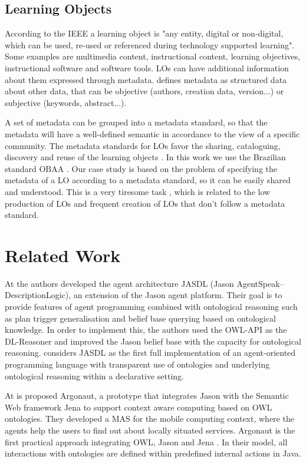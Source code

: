 \documentclass[a4paper,twoside]{article}
\begin{document}
\subsection{Learning Objects}

\noindent According to the IEEE \cite{ref40} a learning object is "any entity, digital or non-digital, which can be used, re-used or referenced during technology supported learning". Some examples are multimedia content, instructional content, learning objectives, instructional software and software tools. LOs can have additional information about them expressed through metadata.
\cite{ref42} defines metadata as structured data about other data, that can be objective (authors, creation data, version...) or subjective (keywords, abstract...). 

A set of metadata can be grouped into a metadata standard, so that the metadata will have a well-defined semantic in accordance to the view of a specific community. The metadata standards for LOs favor the sharing, cataloguing, discovery and reuse of the learning objects \cite{ref42}. In this work we use the Brazilian standard OBAA \cite{refOBAA}. Our case study is based on the problem of specifying the metadata of a LO according to a metadata standard, so it can be easily shared and understood. This is a very tiresome task \cite{ref38}, which is related to the low production of LOs and frequent creation of LOs that don't follow a metadata standard. 

\section{Related Work}
\label{sec:relatedwork}

\noindent At \cite{refB} the authors developed the agent architecture JASDL (Jason AgentSpeak–DescriptionLogic), an  extension of the Jason agent platform. Their goal is to provide features of agent programming combined with ontological reasoning such as plan trigger generalisation and belief base querying based on ontological knowledge. In order to implement this, the authors used the OWL-API as the DL-Reasoner and improved the Jason belief base with the capacity for ontological reasoning. \cite{refB} considers JASDL as the first full implementation of an agent-oriented programming language with transparent use of ontologies and underlying ontological reasoning within a declarative setting.

At \cite{refC} is proposed Argonaut, a prototype that integrates Jason with the Semantic Web framework Jena to support context aware computing based on OWL ontologies. They developed a MAS for the mobile computing context, where the agents help the users to find out about locally situated services. Argonaut is the first practical approach integrating OWL, Jason and Jena \cite{refC}. In their model, all interactions with ontologies are defined within predefined internal actions in Java.
\end{document}

